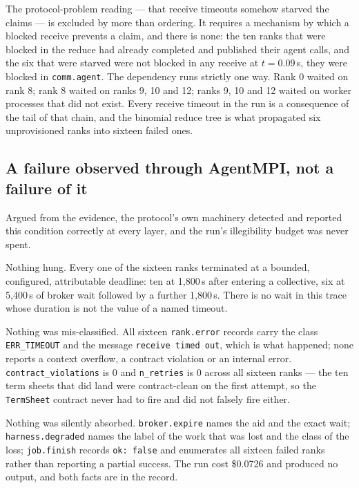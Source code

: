 \documentclass[11pt]{article}
\begin{document}
The protocol-problem reading --- that receive timeouts somehow starved the claims --- is
excluded by more than ordering. It requires a mechanism by which a blocked receive
prevents a claim, and there is none: the ten ranks that were blocked in the reduce had
already completed and published their agent calls, and the six that were starved were not
blocked in any receive at $t=0.09$\,s, they were blocked in \texttt{comm.agent}. The
dependency runs strictly one way. Rank 0 waited on rank 8; rank 8 waited on ranks 9, 10
and 12; ranks 9, 10 and 12 waited on worker processes that did not exist. Every receive
timeout in the run is a consequence of the tail of that chain, and the binomial reduce
tree is what propagated six unprovisioned ranks into sixteen failed ones.

\subsection{A failure observed through AgentMPI, not a failure of it}

Argued from the evidence, the protocol's own machinery detected and reported this
condition correctly at every layer, and the run's illegibility budget was never spent.

Nothing hung. Every one of the sixteen ranks terminated at a bounded, configured,
attributable deadline: ten at 1{,}800\,s after entering a collective, six at 5{,}400\,s
of broker wait followed by a further 1{,}800\,s. There is no wait in this trace whose
duration is not the value of a named timeout.

Nothing was mis-classified. All sixteen \texttt{rank.error} records carry the class
\texttt{ERR\_TIMEOUT} and the message \texttt{receive timed out}, which is what
happened; none reports a context overflow, a contract violation or an internal error.
\texttt{contract\_violations} is 0 and \texttt{n\_retries} is 0 across all sixteen ranks
--- the ten term sheets that did land were contract-clean on the first attempt, so the
\texttt{TermSheet} contract never had to fire and did not falsely fire either.

Nothing was silently absorbed. \texttt{broker.expire} names the aid and the exact wait;
\texttt{harness.degraded} names the label of the work that was lost and the class of the
loss; \texttt{job.finish} records \texttt{ok: false} and enumerates all sixteen failed
ranks rather than reporting a partial success. The run cost \$0.0726 and produced no
output, and both facts are in the record.
\end{document}
